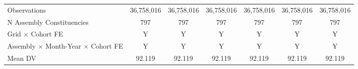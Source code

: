\begin{tabular}{lcccccc}
Observations&  36,758,016         &  36,758,016         &  36,758,016         &  36,758,016         &  36,758,016         &  36,758,016         \\
N Assembly Constituencies&         797         &         797         &         797         &         797         &         797         &         797         \\
Grid $\times$ Cohort FE&           Y         &           Y         &           Y         &           Y         &           Y         &           Y         \\
Assembly $\times$ Month-Year $\times$ Cohort FE&           Y         &           Y         &           Y         &           Y         &           Y         &           Y         \\
Mean DV     &      92.119         &      92.119         &      92.119         &      92.119         &      92.119         &      92.119         \\
\hline
\end{tabular}
